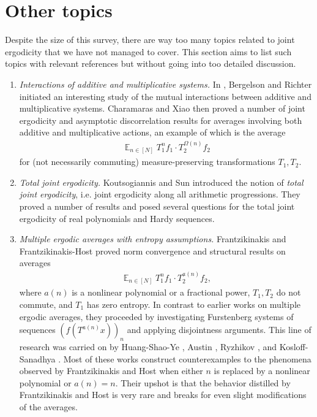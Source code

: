 \documentclass[11pt]{amsart}
\theoremstyle{definition}
\DeclareMathOperator*{\E}{\mathbb{E}}
\newcommand{\1}{{\mathbf{1}}}
\begin{document}
\section{Other topics}\label{S: other topics}
Despite the size of this survey, there are way too many topics related to joint ergodicity that we have not managed to cover. This section aims to list such topics with relevant references but without going into too detailed discussion.
\begin{enumerate}
    \item \emph{Interactions of additive and multiplicative systems.} In \cite{BR22}, Bergelson and Richter initiated an interesting study of the mutual interactions between additive and multiplicative systems. Charamaras \cite{Ch25} and Xiao \cite{Xiao25} then proved a number of joint ergodicity and asymptotic discorrelation results for averages involving both additive and multiplicative actions, an example of which is the average
    \begin{align*}
        \E_{n\in[N]}T_1^n f_1 \cdot T_2^{\Omega(n)}f_2
    \end{align*}
    for (not necessarily commuting) measure-preserving transformations $T_1, T_2$.
    \item \emph{Total joint ergodicity.} Koutsogiannis and Sun \cite{KoSu23} introduced the notion of \emph{total joint ergodicity}, i.e. joint ergodicity along all arithmetic progressions. They proved a number of results and posed several questions for the total joint ergodicity of real polynomials and Hardy sequences. 
    \item \emph{Multiple ergodic averages with entropy assumptions.} Frantzikinakis \cite{Fr22b} and Frantzikinakis-Host \cite{FH23} proved norm convergence and structural results on averages
    \begin{align*}
        \E_{n\in[N]}T_1^n f_1 \cdot T_2^{a(n)}f_2,
    \end{align*}
    where $a(n)$ is a nonlinear polynomial or a fractional power, $T_1, T_2$ do not commute, and $T_1$ has zero entropy. In contrast to earlier works on multiple ergodic averages, they proceeded by investigating Furstenberg systems of sequences $(f(T^{a(n)}x))_n$ and applying disjointness arguments.
    This line of research was carried on by Huang-Shao-Ye \cite{HSY24a, HSY24b, HSY25, HSY26}, Austin \cite{Au25}, Ryzhikov \cite{Ry24}, and Kosloff-Sanadhya \cite{KoSa25, Kosa24}. Most of these works construct counterexamples to the phenomena observed by Frantzikinakis and Host when either $n$ is replaced by a nonlinear polynomial or $a(n) = n$. Their upshot is that the behavior distilled by Frantzikinakis and Host is very rare and breaks for even slight modifications of the averages. 

\end{enumerate}
\end{document}
